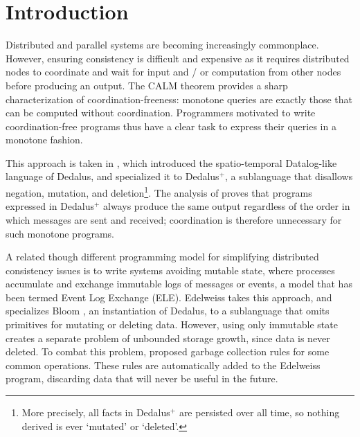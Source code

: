 
\section{Introduction}
\label{sec:intro}

Distributed and parallel systems are becoming increasingly commonplace.
However, ensuring consistency is difficult and expensive as it requires distributed nodes to coordinate and wait for input and / or computation from other nodes before producing an output.
The CALM theorem \cite{hellerstein2010declarative,ameloot2013relational} provides a sharp characterization of coordination-freeness: monotone queries are exactly those that can be computed without coordination.
Programmers motivated to write coordination-free programs thus have a clear task to express their queries in a monotone fashion.

This approach is taken in \cite{marczak2012confluence}, which introduced the spatio-temporal Datalog-like language of Dedalus, and specialized it to Dedalus$^+$, a sublanguage that disallows negation, mutation, and deletion\footnote{
	More precisely, all facts in Dedalus$^+$ are persisted over all time, so nothing derived is ever `mutated' or `deleted'.
}.
The analysis of \cite{marczak2012confluence} proves that programs expressed in Dedalus$^+$ always produce the same output regardless of the order in which messages are sent and received; coordination is therefore unnecessary for such monotone programs.

A related though different programming model for simplifying distributed consistency issues is to write systems avoiding mutable state, where processes accumulate and exchange immutable logs of messages or events, a model that has been termed Event Log Exchange (ELE).
Edelweiss \cite{conway2014edelweiss} takes this approach, and specializes Bloom \cite{alvaro2011consistency}, an instantiation of Dedalus, to a sublanguage that omits primitives for mutating or deleting data.
However, using only immutable state creates a separate problem of unbounded storage growth, since data is never deleted.
To combat this problem, \cite{conway2014edelweiss} proposed garbage collection rules for some common operations.
These rules are automatically added to the Edelweiss program, discarding data that will never be useful in the future.

